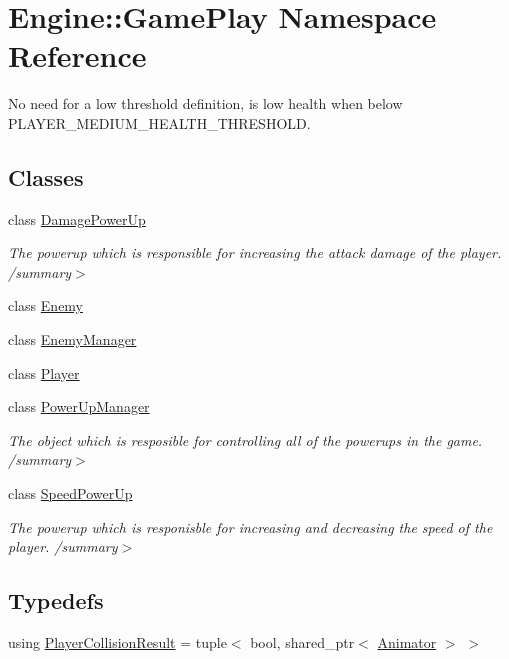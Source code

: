 \hypertarget{namespace_engine_1_1_game_play}{}\section{Engine\+:\+:Game\+Play Namespace Reference}
\label{namespace_engine_1_1_game_play}


No need for a low threshold definition, is low health when below P\+L\+A\+Y\+E\+R\+\_\+\+M\+E\+D\+I\+U\+M\+\_\+\+H\+E\+A\+L\+T\+H\+\_\+\+T\+H\+R\+E\+S\+H\+O\+LD.  


\subsection*{Classes}
\begin{DoxyCompactItemize}
\item 
class \hyperlink{class_engine_1_1_game_play_1_1_damage_power_up}{Damage\+Power\+Up}
\begin{DoxyCompactList}\small\item\em The powerup which is responsible for increasing the attack damage of the player. /summary$>$ \end{DoxyCompactList}\item 
class \hyperlink{class_engine_1_1_game_play_1_1_enemy}{Enemy}
\item 
class \hyperlink{class_engine_1_1_game_play_1_1_enemy_manager}{Enemy\+Manager}
\item 
class \hyperlink{class_engine_1_1_game_play_1_1_player}{Player}
\item 
class \hyperlink{class_engine_1_1_game_play_1_1_power_up_manager}{Power\+Up\+Manager}
\begin{DoxyCompactList}\small\item\em The object which is resposible for controlling all of the powerups in the game. /summary$>$ \end{DoxyCompactList}\item 
class \hyperlink{class_engine_1_1_game_play_1_1_speed_power_up}{Speed\+Power\+Up}
\begin{DoxyCompactList}\small\item\em The powerup which is responisble for increasing and decreasing the speed of the player. /summary$>$ \end{DoxyCompactList}\end{DoxyCompactItemize}
\subsection*{Typedefs}
\begin{DoxyCompactItemize}
\item 
using \hyperlink{namespace_engine_1_1_game_play_a89de39a63577930bef8a01ad64b643c6}{Player\+Collision\+Result} = tuple$<$ bool, shared\+\_\+ptr$<$ \hyperlink{class_engine_1_1_core_1_1_animator}{Animator} $>$ $>$
\end{DoxyCompactItemize}
